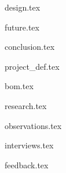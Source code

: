 \documentclass{book}
\begin{document}
{design.tex}

{future.tex}

{conclusion.tex}

\appendix

{project_def.tex}

{bom.tex}

{research.tex}

{observations.tex}

{interviews.tex}

{feedback.tex}

\backmatter
\end{document}
